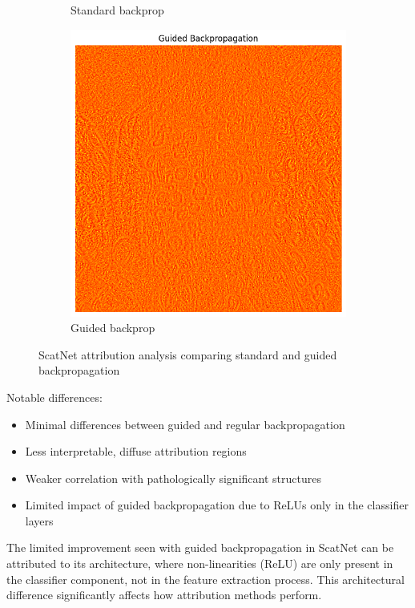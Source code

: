 \documentclass[10pt,twocolumn]{article}
\begin{document}
\begin{figure}[h]
\begin{subfigure}{0.32\columnwidth}
\caption{Standard backprop}
\end{subfigure}
\hfill
\begin{subfigure}{0.32\columnwidth}
\includegraphics[width=\linewidth]{imgs/scatnet_gbp.png}
\caption{Guided backprop}
\end{subfigure}
\caption{ScatNet attribution analysis comparing standard and guided backpropagation}
\label{fig:scatnet_attribution}
\end{figure}

Notable differences:
\begin{itemize}
    \item Minimal differences between guided and regular backpropagation
    \item Less interpretable, diffuse attribution regions
    \item Weaker correlation with pathologically significant structures
    \item Limited impact of guided backpropagation due to ReLUs only in the classifier layers
\end{itemize}

The limited improvement seen with guided backpropagation in ScatNet can be attributed to its architecture, where non-linearities (ReLU) are only present in the classifier component, not in the feature extraction process. This architectural difference significantly affects how attribution methods perform.
\end{document}

